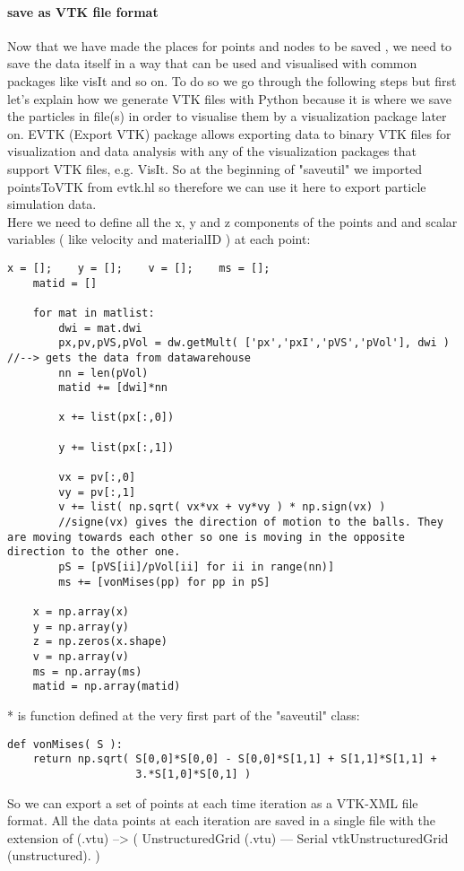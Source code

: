 \paragraph{save as VTK file format}
Now that we have made the places for points and nodes to be saved , we need to save the data itself in a way that can be used and visualised with common packages like visIt and so on. To do so we go through the following steps but first let's explain how we generate VTK files with Python because it is where we save the particles in file(s) in order to visualise them by a visualization package later on.
EVTK (Export VTK) package allows exporting data to binary VTK files for visualization and data analysis with any of the visualization packages that support VTK files, e.g. VisIt. So at the beginning of "saveutil" we imported pointsToVTK from evtk.hl so therefore we can use it here to export particle simulation data.\\
Here we need to define all the x, y and z components of the points and and scalar variables ( like velocity  and materialID ) at each point:
\begin{lstlisting}
x = [];	   y = [];    v = [];    ms = [];
	matid = []
	
	for mat in matlist:
	    dwi = mat.dwi
	    px,pv,pVS,pVol = dw.getMult( ['px','pxI','pVS','pVol'], dwi ) //--> gets the data from datawarehouse
	    nn = len(pVol)
	    matid += [dwi]*nn
	    
	    x += list(px[:,0])
            
	    y += list(px[:,1]) 
	
	    vx = pv[:,0]
	    vy = pv[:,1]
	    v += list( np.sqrt( vx*vx + vy*vy ) * np.sign(vx) )
	    //signe(vx) gives the direction of motion to the balls. They are moving towards each other so one is moving in the opposite direction to the other one.
	    pS = [pVS[ii]/pVol[ii] for ii in range(nn)]
	    ms += [vonMises(pp) for pp in pS]
	    
	x = np.array(x)
	y = np.array(y)
	z = np.zeros(x.shape)
	v = np.array(v)
	ms = np.array(ms)
	matid = np.array(matid)
\end{lstlisting}
* is function defined at the very first part of the "saveutil" class:
\begin{lstlisting}
def vonMises( S ):
    return np.sqrt( S[0,0]*S[0,0] - S[0,0]*S[1,1] + S[1,1]*S[1,1] +
                    3.*S[1,0]*S[0,1] )
\end{lstlisting}
So we can export a set of points at each time iteration as a VTK-XML file format. All the data points at each iteration are saved in a single file with the extension of (.vtu) --> ( UnstructuredGrid (.vtu) — Serial vtkUnstructuredGrid (unstructured). )


